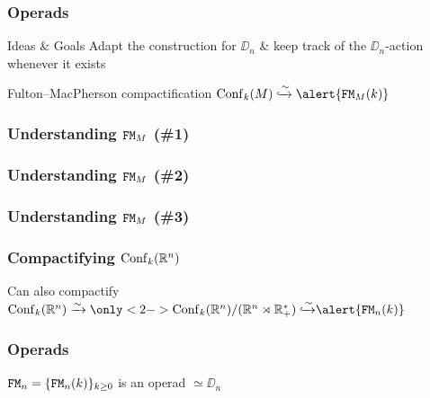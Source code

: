 \documentclass{beamer}
\begin{document}
\begin{frame}
  \frametitle{Operads}
  \begin{block}{Ideas \& Goals}
    Adapt the construction for $\DD_{n}$ \& keep track of the $\DD_{n}$-action whenever it exists
  \end{block}

  \pause
  Fulton--MacPherson compactification $\Conf_{k}(M) \xhookrightarrow{\sim} \alert{\FM_{M}(k)}$
  \begin{center}
    
  \end{center}
\end{frame}

\begin{frame}
  \frametitle{Understanding $\mathtt{FM}_M$ (\#1)}
  \begin{center}
  \end{center}
\end{frame}

\begin{frame}
  \frametitle{Understanding $\mathtt{FM}_M$ (\#2)}
  \begin{center}
  \end{center}
\end{frame}

\begin{frame}
  \frametitle{Understanding $\mathtt{FM}_M$ (\#3)}
  \begin{center}
  \end{center}
\end{frame}

\begin{frame}
  \frametitle{Compactifying $\operatorname{Conf}_{k}(\mathbb{R}^{n})$}
  Can also compactify $\Conf_{k}(\R^{n}) \xrightarrow{\sim} \only<2->{\Conf_{k}(\R^{n}) / (\R^{n} \rtimes \R_{+}^{*}) \xhookrightarrow{\sim}} \alert{\FM_{n}(k)}$
  \begin{center}
    

  \end{center}
\end{frame}

\begin{frame}
  \frametitle{Operads}
  $\mathtt{FM}_{n} = \{ \mathtt{FM}_{n}(k) \}_{k \geq 0}$ is an operad $\simeq \DD_{n}$

  
\end{frame}
\end{document}
